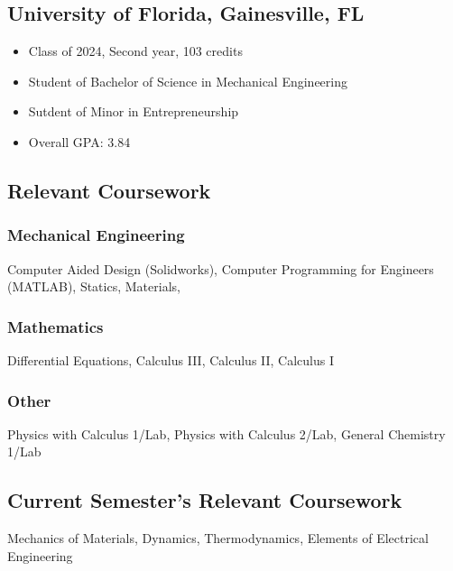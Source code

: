 \documentclass{article}
\newcommand\halftextbox[1]{%
  \parbox[t]{.475\textwidth}{#1}%
}
\newcommand\spacetextbox[1]{%
  \parbox{.05\textwidth}{#1}%
}
\newenvironment{CustomItemize}
{ \begin{itemize}[leftmargin=1em]
    \setlength{\itemsep}{0pt}
    \setlength{\parskip}{0pt}
    \setlength{\parindent}{0pt}
    \setlength{\parsep}{0pt}     }
{ \end{itemize}                  }
\begin{document}
\noindent
\halftextbox{
\begin{raggedright}
\subsection{University of Florida,  Gainesville, FL}
\begin{CustomItemize}
\item Class of 2024, Second year, 103 credits
\item Student of Bachelor of Science in Mechanical Engineering
\item Sutdent of Minor in Entrepreneurship
\item Overall GPA: 3.84
\end{CustomItemize}

\subsection{Relevant Coursework}
\subsubsection{Mechanical Engineering}
Computer Aided Design (Solidworks),
Computer Programming for Engineers (MATLAB),
Statics,
Materials,
\end{raggedright}
}
\spacetextbox{\hfil\hfil}
\halftextbox{
\begin{raggedright}
\subsubsection{Mathematics}
Differential Equations, 
Calculus III,
Calculus II,
Calculus I

\subsubsection{Other}
Physics with Calculus 1/Lab, 
Physics with Calculus 2/Lab, 
General Chemistry 1/Lab

\subsection{Current Semester's Relevant Coursework}
Mechanics of Materials,
Dynamics,
Thermodynamics,
Elements of Electrical Engineering
\end{raggedright}
}
\end{document}
